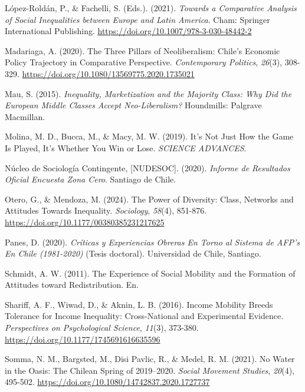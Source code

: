 \documentclass[
  spanish,
  letterpaper,
  DIV=11,
  numbers=noendperiod,
  oneside]{scrartcl}
\newlength{\cslhangindent}
\newenvironment{CSLReferences}[2] %
 {\begin{list}{}{%
  \setlength{\itemindent}{0pt}
  \setlength{\leftmargin}{0pt}
  \setlength{\parsep}{0pt}
  \ifodd #1
   \setlength{\leftmargin}{\cslhangindent}
   \setlength{\itemindent}{-1\cslhangindent}
  \fi
  \setlength{\itemsep}{#2\baselineskip}}}
 {\end{list}}
\begin{document}
\begin{CSLReferences}{1}{0}
López-Roldán, P., \& Fachelli, S. (Eds.). (2021). \emph{Towards a
{Comparative Analysis} of {Social Inequalities} between {Europe} and
{Latin America}}. Cham: Springer International Publishing.
\url{https://doi.org/10.1007/978-3-030-48442-2}

Madariaga, A. (2020). The Three Pillars of Neoliberalism: {Chile}'s
Economic Policy Trajectory in Comparative Perspective.
\emph{Contemporary Politics}, \emph{26}(3), 308-329.
\url{https://doi.org/10.1080/13569775.2020.1735021}

Mau, S. (2015). \emph{Inequality, {Marketization} and the {Majority
Class}: {Why Did} the {European Middle Classes Accept Neo-Liberalism}?}
Houndmills: Palgrave Macmillan.

Molina, M. D., Bucca, M., \& Macy, M. W. (2019). It's Not Just How the
Game Is Played, It's Whether You Win or Lose. \emph{SCIENCE ADVANCES}.

Núcleo de Sociología Contingente, {[}NUDESOC{]}. (2020). \emph{Informe
de Resultados Oficial {Encuesta Zona Cero}}. Santiago de Chile.

Otero, G., \& Mendoza, M. (2024). The {Power} of {Diversity}: {Class},
{Networks} and {Attitudes Towards Inequality}. \emph{Sociology},
\emph{58}(4), 851-876. \url{https://doi.org/10.1177/00380385231217625}

Panes, D. (2020). \emph{Cr{í}ticas y Experiencias Obreras En Torno al
Sistema de {AFP}'s En {Chile} (1981-2020)} (Tesis doctoral). Universidad
de Chile, Santiago.

Schmidt, A. W. (2011). The Experience of Social Mobility and the
Formation of Attitudes toward Redistribution. En.

Shariff, A. F., Wiwad, D., \& Aknin, L. B. (2016). Income {Mobility
Breeds Tolerance} for {Income Inequality}: {Cross-National} and
{Experimental Evidence}. \emph{Perspectives on Psychological Science},
\emph{11}(3), 373-380. \url{https://doi.org/10.1177/1745691616635596}

Somma, N. M., Bargsted, M., Disi Pavlic, R., \& Medel, R. M. (2021). No
Water in the Oasis: The {Chilean Spring} of 2019--2020. \emph{Social
Movement Studies}, \emph{20}(4), 495-502.
\url{https://doi.org/10.1080/14742837.2020.1727737}


\end{CSLReferences}
\end{document}

